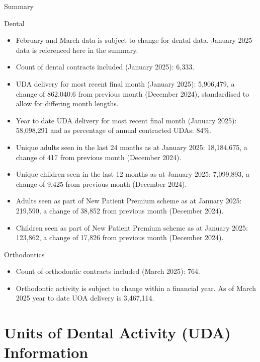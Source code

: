 \documentclass[
  8pt,
  ignorenonframetext,
  aspectratio = 169]{beamer}
\providecommand{\tightlist}{%
  \setlength{\itemsep}{0pt}\setlength{\parskip}{0pt}}
\begin{document}
\begin{frame}{Summary}
\protect\hypertarget{summary-1}{}
\begin{block}{Dental}
\protect\hypertarget{dental}{}
\begin{itemize}
\tightlist
\item
  February and March data is subject to change for dental data. January
  2025 data is referenced here in the summary.
\item
  Count of dental contracts included (January 2025): 6,333.
\item
  UDA delivery for most recent final month (January 2025): 5,906,479, a
  change of 862,040.6 from previous month (December 2024), standardised
  to allow for differing month lengths.
\item
  Year to date UDA delivery for most recent final month (January 2025):
  58,098,291 and as percentage of annual contracted UDAs: 84\%.
\item
  Unique adults seen in the last 24 months as at January 2025:
  18,184,675, a change of 417 from previous month (December 2024).
\item
  Unique children seen in the last 12 months as at January 2025:
  7,099,893, a change of 9,425 from previous month (December 2024).
\item
  Adults seen as part of New Patient Premium scheme as at January 2025:
  219,590, a change of 38,852 from previous month (December 2024).
\item
  Children seen as part of New Patient Premium scheme as at January
  2025: 123,862, a change of 17,826 from previous month (December 2024).
\end{itemize}
\end{block}

\begin{block}{Orthodontics}
\protect\hypertarget{orthodontics}{}
\begin{itemize}
\tightlist
\item
  Count of orthodontic contracts included (March 2025): 764.
\item
  Orthodontic activity is subject to change within a financial year. As
  of March 2025 year to date UOA delivery is 3,467,114.
\end{itemize}
\end{block}
\end{frame}

\hypertarget{units-of-dental-activity-uda-information}{%
\section{Units of Dental Activity (UDA)
Information}\label{units-of-dental-activity-uda-information}}
\end{document}
